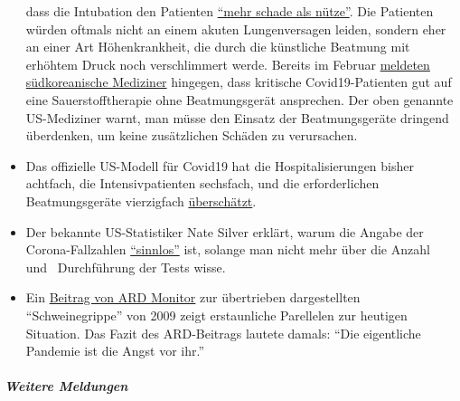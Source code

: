 \begin{itemize}
  dass die Intubation den Patienten
  \href{https://www.youtube.com/watch?v=k9GYTc53r2o}{``mehr schade als
  nütze''}. Die Patienten würden oftmals nicht an einem akuten
  Lungenversagen leiden, sondern eher an einer Art Höhenkrankheit, die
  durch die künstliche Beatmung mit erhöhtem Druck noch verschlimmert
  werde. Bereits im Februar
  \href{https://www.upi.com/Top_News/World-News/2020/02/14/Oxygen-therapy-working-for-coronavirus-patient-Seoul-says/6651581696794/}{meldeten
  südkoreanische Mediziner} hingegen, dass kritische Covid19-Patienten
  gut auf eine Sauerstofftherapie ohne Beatmungsgerät ansprechen. Der
  oben genannte US-Mediziner warnt, man müsse den Einsatz der
  Beatmungsgeräte dringend überdenken, um keine zusätzlichen Schäden zu
  verursachen.
\item
  Das offizielle US-Modell für Covid19 hat die Hospitalisierungen bisher
  achtfach, die Intensiv­patienten sechsfach, und die erforderlichen
  Beatmungsgeräte vierzigfach
  \href{https://twitter.com/NikolovScience/status/1246823479820693505}{überschätzt}.
\item
  Der bekannte US-Statistiker Nate Silver erklärt, warum die Angabe der
  Corona-Fallzahlen
  \href{https://fivethirtyeight.com/features/coronavirus-case-counts-are-meaningless/}{``sinnlos''}
  ist, solange man nicht mehr über die Anzahl und~ Durchführung der
  Tests wisse.
\item
  Ein \href{https://www.youtube.com/watch?v=EpSdCh1KT1A}{Beitrag von ARD
  Monitor} zur übertrieben dargestellten ``Schweinegrippe'' von 2009
  zeigt erstaunliche Parellelen zur heutigen Situation. Das Fazit des
  ARD-Beitrags lautete damals: ``Die eigentliche Pandemie ist die Angst
  vor ihr.''
\end{itemize}

\hypertarget{weitere-meldungen-1}{%
\subparagraph{\texorpdfstring{\textbf{Weitere
Meldungen}}{Weitere Meldungen}}\label{weitere-meldungen-1}}

